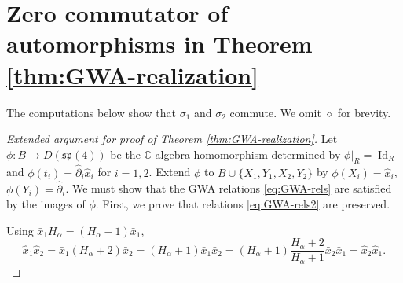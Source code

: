 \documentclass[10pt,a4paper]{amsart}
\numberwithin{equation}{section}
\DeclareMathOperator{\Id}{Id}
\begin{document}
\appendix

\section[Zero commutator of automorphisms in Theorem 4.6]{Zero commutator of automorphisms in Theorem \ref{thm:GWA-realization}}\label{Appendix:sec:Zero-Commutator}
The computations below show that $\sigma_{1}$ and $\sigma_{2}$ commute.
We omit $\diamond$ for brevity.

\begin{proof}[Extended argument for proof of Theorem \ref{thm:GWA-realization}]
	Let $\phi\colon B\to D(\mathfrak{sp}(4))$ be the $\mathbb{C}$-algebra homomorphism determined by $\phi|_R=\Id_R$ and $\phi(t_i)=\hat\partial_i\hat x_i$ for $i=1,2$. Extend $\phi$ to $B\cup\{X_1,Y_1,X_2,Y_2\}$ by $\phi(X_i)=\hat x_i$, $\phi(Y_i)=\hat\partial_i$. We must show that the GWA relations \eqref{eq:GWA-rels} are satisfied by the images of $\phi$.
	First, we prove that relations \eqref{eq:GWA-rels2} are preserved.
	
	Using $\bar{x}_1 H_\alpha = (H_\alpha-1)\bar{x}_1$,
	\[
	\hat{x}_1\hat{x}_2 = \bar{x}_1(H_\alpha+2)\bar{x}_2 = (H_\alpha+1)\bar{x}_1\bar{x}_2=(H_\alpha+1)\frac{H_\alpha+2}{H_\alpha+1}\bar{x}_2\bar{x}_1=\hat{x}_2\hat{x}_1.
	\]
	

\end{proof}
\end{document}
